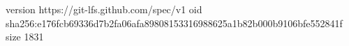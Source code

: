 version https://git-lfs.github.com/spec/v1
oid sha256:e176fcb69336d7b2fa06afa89808153316988625a1b82b000b9106bfe552841f
size 1831
